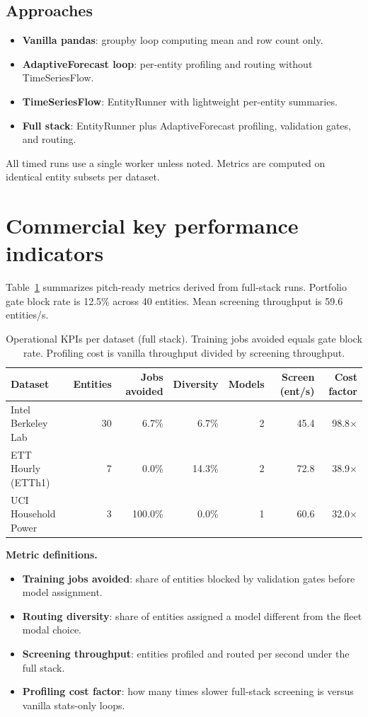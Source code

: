 \documentclass[11pt,a4paper]{article}
\begin{document}
\subsection{Approaches}
\begin{itemize}
  \item \textbf{Vanilla pandas}: groupby loop computing mean and row count only.
  \item \textbf{AdaptiveForecast loop}: per-entity profiling and routing without TimeSeriesFlow.
  \item \textbf{TimeSeriesFlow}: EntityRunner with lightweight per-entity summaries.
  \item \textbf{Full stack}: EntityRunner plus AdaptiveForecast profiling, validation gates, and routing.
\end{itemize}

All timed runs use a single worker unless noted. Metrics are computed on identical entity subsets per dataset.

\section{Commercial key performance indicators}
Table~\ref{tab:kpi} summarizes pitch-ready metrics derived from full-stack runs.
Portfolio gate block rate is 12.5\% across 40 entities.
Mean screening throughput is 59.6 entities/s.

\begin{table}[htbp]
\centering
\caption{Operational KPIs per dataset (full stack). Training jobs avoided equals gate block rate. Profiling cost is vanilla throughput divided by screening throughput.}
\label{tab:kpi}
\small
\begin{tabular}{lrrrrrr}
\toprule
Dataset & Entities & Jobs avoided & Diversity & Models & Screen (ent/s) & Cost factor \\
\midrule
Intel Berkeley Lab & 30 & 6.7\% & 6.7\% & 2 & 45.4 & 98.8$\times$ \\
ETT Hourly (ETTh1) & 7 & 0.0\% & 14.3\% & 2 & 72.8 & 38.9$\times$ \\
UCI Household Power & 3 & 100.0\% & 0.0\% & 1 & 60.6 & 32.0$\times$ \\
\bottomrule
\end{tabular}
\end{table}

\textbf{Metric definitions.}
\begin{itemize}
  \item \textbf{Training jobs avoided}: share of entities blocked by validation gates before model assignment.
  \item \textbf{Routing diversity}: share of entities assigned a model different from the fleet modal choice.
  \item \textbf{Screening throughput}: entities profiled and routed per second under the full stack.
  \item \textbf{Profiling cost factor}: how many times slower full-stack screening is versus vanilla stats-only loops.
\end{itemize}
\end{document}
